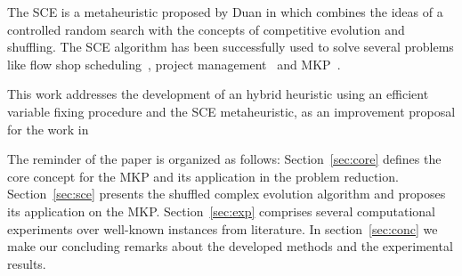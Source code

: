 The SCE is a metaheuristic proposed by Duan in \cite{duan1992effective}
which combines the ideas of a controlled random search with the concepts
of competitive evolution and shuffling.
The SCE algorithm has been successfully used to solve several problems
like flow shop scheduling~\cite{zhao2014shuffled}, project management~\cite{elbeltagi2007modified}
and MKP~\cite{baroni2015shuffled}.

This work addresses the development of an hybrid heuristic using an
efficient variable fixing procedure and the SCE metaheuristic, as an improvement
proposal for the work in \cite{baroni2015shuffled}

The reminder of the paper is organized as follows:
Section~\ref{sec:core} defines the core concept for the MKP and its application
in the problem reduction.
Section~\ref{sec:sce} presents the shuffled complex evolution algorithm
and proposes its application on the MKP.
Section~\ref{sec:exp} comprises several computational experiments over well-known
instances from literature.
In section~\ref{sec:conc} we make our concluding remarks about the developed
methods and the experimental results.

